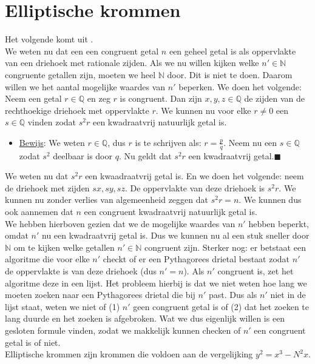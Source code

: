\documentclass[12pt,reqno]{article}
\newcommand*{\NN}{\ensuremath{\mathbb{N}}}
\newcommand*{\QQ}{\ensuremath{\mathbb{Q}}}
\newcommand*{\QED}{\hfill\ensuremath{\blacksquare}}
\begin{document}
	
	\section{Elliptische krommen}
	Het volgende komt uit \cite{Koblitz}.\\
	We weten nu dat een een congruent getal $n$ een geheel getal is als oppervlakte van een driehoek met rationale zijden. Als we nu willen kijken welke $n'\in\NN$ congruente getallen zijn, moeten we heel $\NN$ door. Dit is niet te doen. Daarom willen we het aantal mogelijke waardes van $n'$ beperken. We doen het volgende:\\
	Neem een getal $r\in\QQ$ en zeg $r$ is congruent. Dan zijn $x,y,z\in\QQ$ de zijden van de rechthoekige driehoek met oppervlakte $r$. We kunnen nu voor elke $r\neq0$ een $s\in\QQ$ vinden zodat $s^2r$ een kwadraatvrij natuurlijk getal is.
	\begin{itemize}
		\item[] \underline{Bewijs}: We weten $r\in\QQ$, dus $r$ is te schrijven als: $r=\frac{p}{q}$. Neem nu een $s\in\QQ$ zodat $s^2$ deelbaar is door $q$. {\color{red}Nu geldt dat $s^2r$ een kwadraatvrij getal.}\QED
	\end{itemize}
	We weten nu dat $s^2r$ een kwaadraatvrij getal is. En we doen het volgende: neem de driehoek met zijden $sx,sy,sz$. De oppervlakte van deze driehoek is $s^2r$. We kunnen nu zonder verlies van algemeenheid zeggen dat $s^2r=n$. We kunnen dus ook aannemen dat $n$ een congruent kwadraatvrij natuurlijk getal is. \\
	
	We hebben hierboven gezien dat we de mogelijke waardes van $n'$ hebben beperkt, omdat $n'$ nu een kwadraatvrij getal is. Dus we kunnen nu al een stuk sneller door $\NN$ om te kijken welke getallen $n'\in\NN$ congruent zijn. Sterker nog: er betstaat een algoritme die voor elke $n'$ checkt of er een Pythagorees drietal bestaat zodat $n'$ de oppervlakte is van deze driehoek (dus $n'=n$). Als $n'$ congruent is, zet het algoritme deze in een lijst. Het probleem hierbij is dat we niet weten hoe lang we moeten zoeken naar een Pythagorees drietal die bij $n'$ past. Dus als $n'$ niet in de lijst staat, weten we niet of (1) $n'$ geen congruent getal is of (2) dat het zoeken te lang duurde en het zoeken is afgebroken. Wat we dus eigenlijk willen is een gesloten formule vinden, zodat we makkelijk kunnen checken of $n'$ een congruent getal is of niet.\\
	
	Elliptische krommen zijn krommen die voldoen aan de vergelijking $y^2=x^3-N^2x$. 
	
	
	
\end{document}

